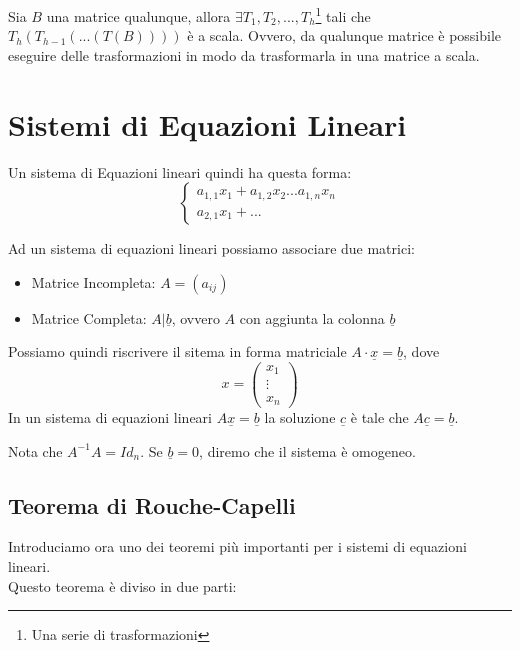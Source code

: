 Sia $B$ una matrice qualunque, allora $\exists T_1,T_2,...,T_h$\footnote{Una serie di trasformazioni} tali che
$T_h(T_{h-1}(...(T(B))))$ è a scala. Ovvero, da qualunque matrice è possibile eseguire delle trasformazioni in modo da trasformarla in una matrice a scala.

\section{Sistemi di Equazioni Lineari}
Un sistema di Equazioni lineari quindi ha questa forma:
\[
	\begin{cases}
		a_{1,1} x_1 + a_{1,2}x_2 ... a_{1,n} x_n \\
		a_{2,1} x_1 + ...
	\end{cases}
\]

Ad un sistema di equazioni lineari possiamo associare due matrici:
\begin{itemize}
	\item Matrice Incompleta: $A=(a_{ij})$
	\item Matrice Completa: $A|\underline{b}$, ovvero $A$ con aggiunta la colonna $\underline{b}$
\end{itemize}
Possiamo quindi riscrivere il sitema in forma matriciale $A \cdot \underline{x} = \underline{b}$, dove
\[x=\begin{pmatrix}x_1\\\vdots\\x_n\end{pmatrix}\]
In un sistema di equazioni lineari $A\underline{x} = \underline{b}$ la soluzione $\underline{c}$ è tale che $A\underline{c}=\underline{b}$.

Nota che $A^{-1} A = Id_n$. Se $\underline{b}=0$, diremo che il sistema è omogeneo.

\subsection{Teorema di Rouche-Capelli}
Introduciamo ora uno dei teoremi più importanti per i sistemi di equazioni lineari.
\\Questo teorema è diviso in due parti:

